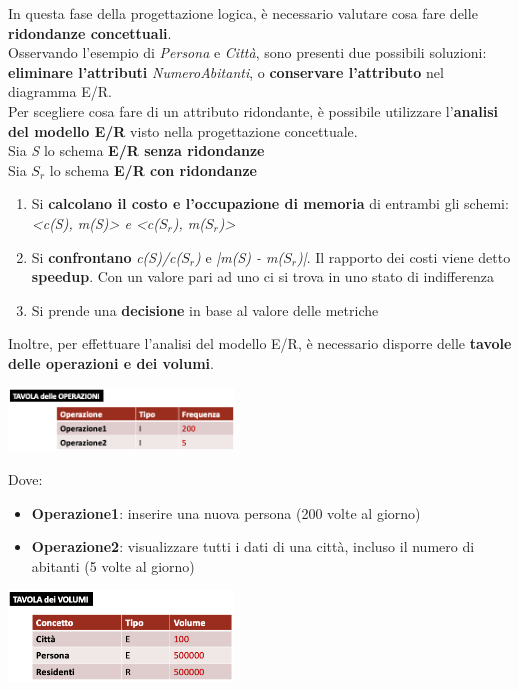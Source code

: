 \documentclass{article}
\begin{document}
In questa fase della progettazione logica, è necessario valutare cosa fare delle \textbf{ridondanze concettuali}.\\
Osservando l'esempio di \textit{Persona} e \textit{Città}, sono presenti due possibili soluzioni: \textbf{eliminare l'attributi} \textit{NumeroAbitanti}, o \textbf{conservare l'attributo} nel diagramma E/R.\vspace{14pt}\\
Per scegliere cosa fare di un attributo ridondante, è possibile utilizzare l'\textbf{analisi del modello E/R} visto nella progettazione concettuale.\vspace{14pt}\\
Sia \textit{S} lo schema \textbf{E/R senza ridondanze}\\
Sia \textit{$S_r$} lo schema \textbf{E/R con ridondanze}
\begin{enumerate}[leftmargin=1cm]
    \itemsep0em
    \item Si \textbf{calcolano il costo e l'occupazione di memoria} di entrambi gli schemi: \\
    \textit{<c(S), m(S)> e <c($S_r$), m($S_r$)>}
    \item Si \textbf{confrontano} \textit{c(S)/c($S_r$)} e \textit{|m(S) - m($S_r$)|}. Il rapporto dei costi viene detto \textbf{speedup}. Con un valore pari ad uno ci si trova in uno stato di indifferenza
    \item Si prende una \textbf{decisione} in base al valore delle metriche
\end{enumerate}
Inoltre, per effettuare l'analisi del modello E/R, è necessario disporre delle \textbf{tavole delle operazioni e dei volumi}.
\begin{center}
    \includegraphics[width=0.45\textwidth]{foto 8.png}
\end{center}
Dove:
\begin{itemize}[label={-}, leftmargin=1cm]
    \itemsep0em
    \item \textbf{Operazione1}: inserire una nuova persona (200 volte al giorno)
    \item \textbf{Operazione2}: visualizzare tutti i dati di una città, incluso il numero di abitanti (5 volte al giorno)
\end{itemize}
\begin{center}
    \includegraphics[width=0.45\textwidth]{foto 9.png}
\end{center}
\end{document}
